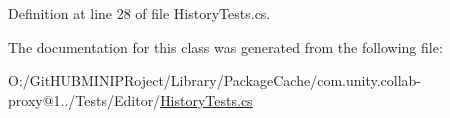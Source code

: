 Definition at line 28 of file History\+Tests.\+cs.



The documentation for this class was generated from the following file\+:\begin{DoxyCompactItemize}
\item 
O\+:/\+Git\+H\+U\+B\+M\+I\+N\+I\+P\+Roject/\+Library/\+Package\+Cache/com.\+unity.\+collab-\/proxy@1../\+Tests/\+Editor/\mbox{\hyperlink{_history_tests_8cs}{History\+Tests.\+cs}}\end{DoxyCompactItemize}
